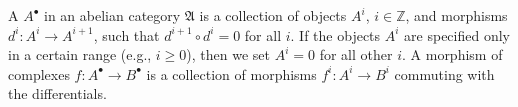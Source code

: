 A  $A^\bullet$ in an abelian category $\mathfrak{A}$ is a collection of objects $A^i$, $i \in \mathbb{Z}$, and morphisms $d^i: A^i \to A^{i+1}$, such that $d^{i+1} \circ d^i = 0$ for all $i$. If the objects $A^i$ are specified only in a certain range (e.g., $i \geqslant 0$), then we set $A^i = 0$ for all other $i$. A morphism of complexes $f: A^\bullet \to B^\bullet$ is a collection of morphisms $f^i: A^i \to B^i$ commuting with the differentials.
